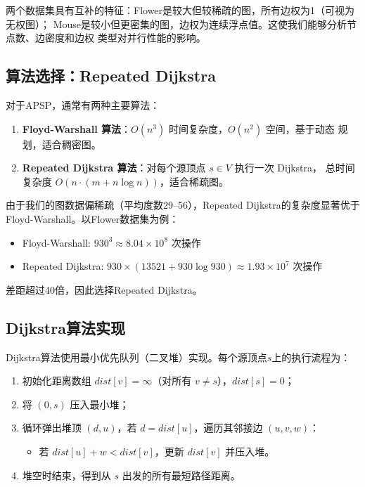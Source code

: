 \documentclass[UTF8,a4paper,12pt,fontset=none]{ctexart}
\begin{document}
两个数据集具有互补的特征：Flower是较大但较稀疏的图，所有边权为1（可视为无权图）；
Mouse是较小但更密集的图，边权为连续浮点值。这使我们能够分析节点数、边密度和边权
类型对并行性能的影响。

\subsection{算法选择：Repeated Dijkstra}

对于APSP，通常有两种主要算法：

\begin{enumerate}[leftmargin=2.2em]
  \item \textbf{Floyd-Warshall 算法}：$O(n^3)$ 时间复杂度，$O(n^2)$ 空间，基于动态
        规划，适合稠密图。
  \item \textbf{Repeated Dijkstra 算法}：对每个源顶点 $s \in V$ 执行一次 Dijkstra，
        总时间复杂度 $O(n \cdot (m + n \log n))$，适合稀疏图。
\end{enumerate}

由于我们的图数据偏稀疏（平均度数29--56），Repeated Dijkstra的复杂度显著优于
Floyd-Warshall。以Flower数据集为例：
\begin{itemize}
  \item Floyd-Warshall: $930^3 \approx 8.04 \times 10^8$ 次操作
  \item Repeated Dijkstra: $930 \times (13521 + 930 \log 930) \approx 1.93 \times 10^7$ 次操作
\end{itemize}

差距超过40倍，因此选择Repeated Dijkstra。

\subsection{Dijkstra算法实现}

Dijkstra算法使用最小优先队列（二叉堆）实现。每个源顶点$s$上的执行流程为：

\begin{enumerate}[leftmargin=2.2em]
  \item 初始化距离数组 $\mathit{dist}[v] = \infty$（对所有 $v \neq s$），$\mathit{dist}[s] = 0$；
  \item 将 $(0, s)$ 压入最小堆；
  \item 循环弹出堆顶 $(d, u)$，若 $d = \mathit{dist}[u]$，遍历其邻接边 $(u, v, w)$：
        \begin{itemize}
          \item 若 $\mathit{dist}[u] + w < \mathit{dist}[v]$，更新 $\mathit{dist}[v]$ 并压入堆。
        \end{itemize}
  \item 堆空时结束，得到从 $s$ 出发的所有最短路径距离。
\end{enumerate}
\end{document}
